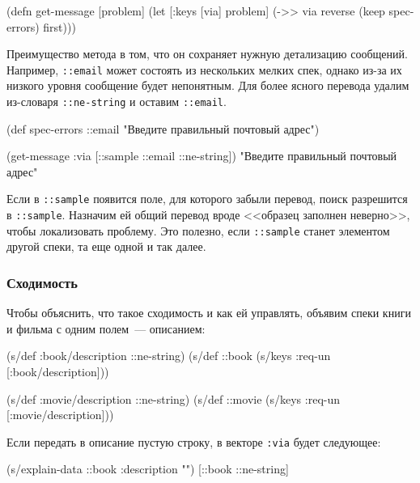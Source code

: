 \begin{english}
  \begin{clojure}
(defn get-message
  [problem]
  (let [{:keys [via]} problem]
    (->> via
         reverse
         (keep spec-errors)
         first)))
  \end{clojure}
\end{english}

Преимущество метода в том, что он сохраняет нужную детализацию
сообщений. Например, \verb|::email| может состоять из нескольких мелких спек,
однако из-за их низкого уровня сообщение будет непонятным. Для более ясного
перевода удалим из-словаря \verb|::ne-string| и оставим \verb|::email|.

  \begin{clojure}
(def spec-errors
  {::email "Введите правильный почтовый адрес"})

(get-message {:via [::sample ::email ::ne-string]})
"Введите правильный почтовый адрес"
  \end{clojure}

Если в \verb|::sample| появится поле, для которого забыли перевод, поиск
разрешится в \verb|::sample|. Назначим ей общий перевод вроде <<образец
заполнен неверно>>, чтобы локализовать проблему. Это полезно, если
\verb|::sample| станет элементом другой спеки, та еще одной и так далее.

\subsubsection{Сходимость}

Чтобы объяснить, что такое сходимость и как ей управлять, объявим спеки книги и
фильма с одним полем~--- описанием:

\begin{english}
  \begin{clojure}
(s/def :book/description ::ne-string)
(s/def ::book (s/keys :req-un [:book/description]))

(s/def :movie/description ::ne-string)
(s/def ::movie (s/keys :req-un [:movie/description]))
  \end{clojure}
\end{english}

Если передать в описание пустую строку, в векторе \verb|:via| будет следующее:

\begin{english}
  \begin{clojure}
(s/explain-data ::book {:description ""})
[::book ::ne-string]
  \end{clojure}
\end{english}

